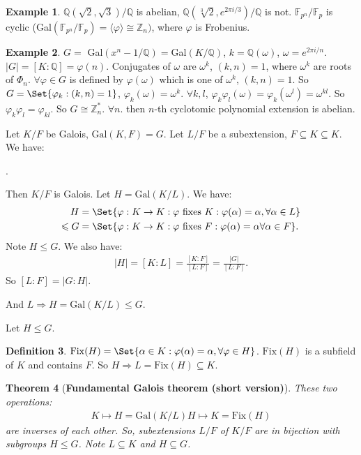 \documentclass[9pt,reqno,twoside]{amsbook}
\theoremstyle{plain}
\newtheorem{theorem}{Theorem}[chapter]
\numberwithin{section}{chapter}
\numberwithin{equation}{chapter}
\theoremstyle{definition}
\newtheorem{Def}[theorem]{Definition}
\newtheorem{Ex}[theorem]{Example}
\theoremstyle{remark}
\theoremstyle{plain}
\newcommand{\sub}{\subseteq}
\newcommand{\z}{\mathbb{Z}}
\newcommand{\Q}{\mathbb{Q}}
\newcommand{\F}{\mathbb{F}}
\newcommand{\bee}{\begin{equation}\begin{aligned}}
\newcommand{\eee}{\end{aligned}\end{equation}}
\newcommand{\fracc}{\frac}
\newcommand{\gal}{\mathrm{Gal}}
\newcommand{\fix}{\mathrm{Fix}}
\renewcommand{\leq}{\leqslant}
\renewcommand{\phi}{\varphi}
\begin{document}
\begin{Ex}
$\Q(\sqrt{2},\sqrt{3})/\Q$ is abelian, $\Q(\sqrt[3]{2},e^{2\pi i/3})/\Q$ is not. $\F_{p^n}/\F_p$ is cyclic (Gal$(\F_{p^n}/\F_p) = \langle \phi \rangle \cong \z_n)$, where $\phi$ is Frobenius. 
\end{Ex}

\begin{Ex}
$G = $ Gal$(x^n - 1/\Q) = $Gal$(K/\Q)$, $k = \Q(\omega)$, $\omega = e^{2\pi i/n}$. $|G| = [K:\Q] = \phi(n)$. Conjugates of $\omega$ are $\omega^k$, $(k,n) = 1$, where $\omega^k$ are roots of $\Phi_n$. $\forall \phi \in G$ is defined by $\phi(\omega)$ which is one of $\omega^k$, $(k,n) = 1$. So $G = \Set{\phi_k:(k,n) = 1}$, $\phi_k(\omega) = \omega^k$. $\forall k,l$, $\phi_k\phi_l(\omega) = \phi_k(\omega^l) = \omega^{kl}$. So $\phi_k\phi_l = \phi_{kl}$. So $G \cong \z_n^*$. $\forall n$. then $n$-th cyclotomic polynomial extension is abelian. 
\end{Ex}

Let $K/F$ be Galois, $\gal (K,F) = G$. Let $L/F$ be a subextension, $F\sub K \sub K$. We have:
\begin{center}
.
\end{center}

Then $K/F$ is Galois. Let $H = \gal (K/L)$. We have:
\bee
H &= \Set{\phi:K \to K : \phi \text{ fixes }K:\phi(\alpha) = \alpha, \forall \alpha \in L}\\
\leq G &= \Set{\phi:K \to K: \phi \text{ fixes }F:\phi(\alpha) = \alpha \forall \alpha \in F}.
\eee
Note $H \leq G$. We also have:
\bee
|H| = [K:L] = \fracc{[K:F]}{[L:F]} = \fracc{|G|}{[L:F]}.
\eee
So $[L:F] = |G:H|$. 

And $L \Rightarrow H = \gal (K/L) \leq G$. 


Let $H\leq G$. 
\begin{Def}
$\fix(H)  = \Set{\alpha \in K:\phi(\alpha) = \alpha, \forall \phi \in H}$. $\fix(H)$ is a subfield of $K$ and contains $F$. So $H \Rightarrow L = \fix(H) \sub K$. 
\end{Def}

\begin{theorem}[\textbf{Fundamental Galois theorem (short version)}]
These two operations: 
\bee
K \mapsto H = \gal(K/L)
H \mapsto K = \fix(H)
\eee
are inverses of each other. So, subextensions $L/F$ of $K/F$ are in bijection with subgroups $H \leq G$. Note $L \sub K$ and $H \sub G$. 
\end{theorem}
\end{document}
